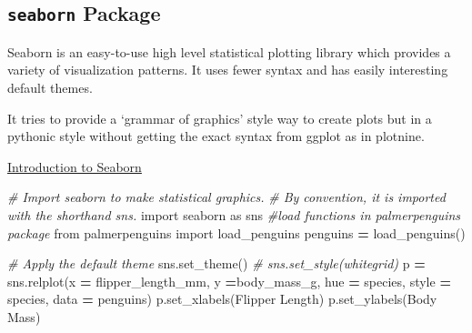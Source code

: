 \documentclass[
]{book}
\newenvironment{Shaded}{\begin{snugshade}}{\end{snugshade}}
\newcommand{\CommentTok}[1]{\textcolor[rgb]{0.56,0.35,0.01}{\textit{#1}}}
\newcommand{\ImportTok}[1]{#1}
\newcommand{\NormalTok}[1]{#1}
\newcommand{\OperatorTok}[1]{\textcolor[rgb]{0.81,0.36,0.00}{\textbf{#1}}}
\newcommand{\StringTok}[1]{\textcolor[rgb]{0.31,0.60,0.02}{#1}}
\begin{document}
\hypertarget{seaborn-package}{%
\subsection{\texorpdfstring{\texttt{seaborn} Package}{seaborn Package}}\label{seaborn-package}}

Seaborn is an easy-to-use high level statistical plotting library which provides a variety of visualization patterns. It uses fewer syntax and has easily interesting default themes.

It tries to provide a `grammar of graphics' style way to create plots but in a pythonic style without getting the exact syntax from ggplot as in plotnine.

\href{https://elitedatascience.com/python-seaborn-tutorial}{Introduction to Seaborn}

\begin{Shaded}
\begin{Highlighting}[]
\CommentTok{\# Import seaborn to make statistical graphics. }
\CommentTok{\# By convention, it is imported with the shorthand sns.}
\ImportTok{import}\NormalTok{ seaborn }\ImportTok{as}\NormalTok{ sns }
\CommentTok{\#load functions in palmerpenguins package}
\ImportTok{from}\NormalTok{ palmerpenguins }\ImportTok{import}\NormalTok{ load\_penguins}
\NormalTok{penguins }\OperatorTok{=}\NormalTok{ load\_penguins()}

\CommentTok{\# Apply the default theme}
\NormalTok{sns.set\_theme()}
\CommentTok{\# sns.set\_style(\textquotesingle{}whitegrid\textquotesingle{})}
\NormalTok{p }\OperatorTok{=}\NormalTok{ sns.relplot(x }\OperatorTok{=} \StringTok{\textquotesingle{}flipper\_length\_mm\textquotesingle{}}\NormalTok{,}
\NormalTok{            y }\OperatorTok{=}\StringTok{\textquotesingle{}body\_mass\_g\textquotesingle{}}\NormalTok{,}
\NormalTok{            hue }\OperatorTok{=} \StringTok{\textquotesingle{}species\textquotesingle{}}\NormalTok{,}
\NormalTok{            style }\OperatorTok{=} \StringTok{\textquotesingle{}species\textquotesingle{}}\NormalTok{,}
\NormalTok{            data }\OperatorTok{=}\NormalTok{ penguins)}
\NormalTok{p.set\_xlabels(}\StringTok{\textquotesingle{}Flipper Length\textquotesingle{}}\NormalTok{)}
\NormalTok{p.set\_ylabels(}\StringTok{\textquotesingle{}Body Mass\textquotesingle{}}\NormalTok{)   }
\end{Highlighting}
\end{Shaded}
\end{document}
